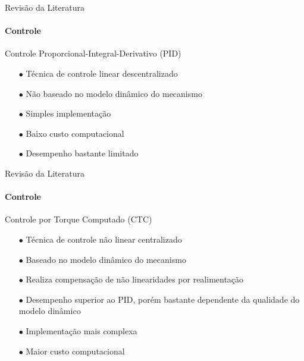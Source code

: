 \documentclass[25pt,landscape]{beamer}
\begin{document}
\begin{frame}{Revisão da Literatura}
    \framesubtitle{Controle}
    \begin{block}{Controle Proporcional-Integral-Derivativo (PID)}
        \begin{itemize}
            \item[$\bullet$] Técnica de controle linear descentralizado \\[8pt]
            \item[$\bullet$] Não baseado no modelo dinâmico do mecanismo \\[8pt]
            \item[$\bullet$] Simples implementação \\[8pt]
            \item[$\bullet$] Baixo custo computacional \\[8pt]
            \item[$\bullet$] Desempenho bastante limitado \\[8pt]
        \end{itemize}
    \end{block}
\end{frame}

\begin{frame}{Revisão da Literatura}
    \framesubtitle{Controle}
    \begin{block}{Controle por Torque Computado (CTC)}
        \begin{itemize}
            \item[$\bullet$] Técnica de controle não linear centralizado \\[8pt]
            \item[$\bullet$] Baseado no modelo dinâmico do mecanismo \\[8pt]
            \item[$\bullet$] Realiza compensação de não linearidades por realimentação \\[8pt]
            \item[$\bullet$] Desempenho superior ao PID, porém bastante dependente da qualidade do modelo dinâmico \\[8pt]
            \item[$\bullet$] Implementação mais complexa \\[8pt]
            \item[$\bullet$] Maior custo computacional \\[8pt]
        \end{itemize}
    \end{block}
\end{frame}
\end{document}
